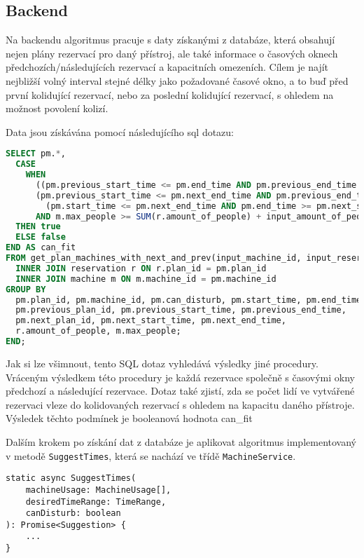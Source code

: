 \subsection{Backend}
Na backendu algoritmus pracuje s daty získanými z databáze, která obsahují nejen plány rezervací pro daný přístroj, ale také informace o časových oknech předchozích/následujících rezervací a kapacitních omezeních. Cílem je najít nejbližší volný interval stejné délky jako požadované časové okno, a to buď před první kolidující rezervací, nebo za poslední kolidující rezervací, s ohledem na možnost povolení kolizí.

Data jsou získávána pomocí následujícího sql dotazu:
\begin{lstlisting}[language=SQL]
SELECT pm.*,
  CASE
    WHEN
      ((pm.previous_start_time <= pm.end_time AND pm.previous_end_time >= pm.start_time) OR
      (pm.previous_start_time <= pm.next_end_time AND pm.previous_end_time >= pm.next_start_time) OR
        (pm.start_time <= pm.next_end_time AND pm.end_time >= pm.next_start_time))
      AND m.max_people >= SUM(r.amount_of_people) + input_amount_of_people
  THEN true
  ELSE false
END AS can_fit
FROM get_plan_machines_with_next_and_prev(input_machine_id, input_reservation_date) pm
  INNER JOIN reservation r ON r.plan_id = pm.plan_id
  INNER JOIN machine m ON m.machine_id = pm.machine_id
GROUP BY
  pm.plan_id, pm.machine_id, pm.can_disturb, pm.start_time, pm.end_time,
  pm.previous_plan_id, pm.previous_start_time, pm.previous_end_time,
  pm.next_plan_id, pm.next_start_time, pm.next_end_time,
  r.amount_of_people, m.max_people;
END;
\end{lstlisting}
Jak si lze všimnout, tento SQL dotaz vyhledává výsledky jiné procedury. Vráceným výsledkem této procedury je každá rezervace společně s časovými okny předchozí a následující rezervace.
Dotaz také zjistí, zda se počet lidí ve vytvářené rezervaci vleze do kolidovaných rezervací s ohledem na kapacitu daného přístroje. Výsledek těchto podmínek je booleanová hodnota can\_fit

Dalším krokem po získání dat z databáze je aplikovat algoritmus implementovaný v metodě \texttt{SuggestTimes}, která se nachází ve třídě \texttt{MachineService}. 

\begin{lstlisting}
static async SuggestTimes(
    machineUsage: MachineUsage[],
    desiredTimeRange: TimeRange,
    canDisturb: boolean
): Promise<Suggestion> {
    ...
}
\end{lstlisting}


